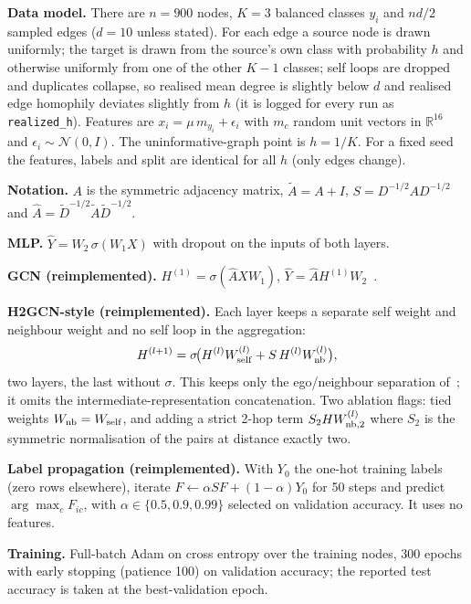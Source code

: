 \textbf{Data model.} There are $n=900$ nodes, $K=3$ balanced classes $y_i$ and $n d/2$ sampled edges ($d=10$ unless stated). For each edge a source node is drawn uniformly; the target is drawn from the source's own class with probability $h$ and otherwise uniformly from one of the other $K-1$ classes; self loops are dropped and duplicates collapse, so realised mean degree is slightly below $d$ and realised edge homophily deviates slightly from $h$ (it is logged for every run as \texttt{realized\_h}). Features are $x_i=\mu\, m_{y_i}+\epsilon_i$ with $m_c$ random unit vectors in $\mathbb{R}^{16}$ and $\epsilon_i\sim\mathcal{N}(0,I)$. The uninformative-graph point is $h=1/K$. For a fixed seed the features, labels and split are identical for all $h$ (only edges change).

\textbf{Notation.} $A$ is the symmetric adjacency matrix, $\tilde A=A+I$, $S=D^{-1/2}AD^{-1/2}$ and $\hat A=\tilde D^{-1/2}\tilde A\tilde D^{-1/2}$.

\textbf{MLP.} $\hat Y = W_2\,\sigma(W_1 X)$ with dropout on the inputs of both layers.

\textbf{GCN (reimplemented).} $H^{(1)}=\sigma(\hat A X W_1)$, $\hat Y=\hat A H^{(1)}W_2$~\cite{kipf2016semi}.

\textbf{H2GCN-style (reimplemented).} Each layer keeps a separate self weight and neighbour weight and no self loop in the aggregation:
\begin{equation}
H^{(l+1)}=\sigma\!\big(H^{(l)}W_{\rm self}^{(l)}+ S\,H^{(l)}W_{\rm nb}^{(l)}\big),
\end{equation}
two layers, the last without $\sigma$. This keeps only the ego/neighbour separation of~\cite{zhu2020beyond}; it omits the intermediate-representation concatenation. Two ablation flags: tied weights $W_{\rm nb}=W_{\rm self}$, and adding a strict 2-hop term $S_2 H W^{(l)}_{{\rm nb},2}$ where $S_2$ is the symmetric normalisation of the pairs at distance exactly two.

\textbf{Label propagation (reimplemented).} With $Y_0$ the one-hot training labels (zero rows elsewhere), iterate $F\leftarrow \alpha S F+(1-\alpha)Y_0$ for 50 steps and predict $\arg\max_c F_{ic}$, with $\alpha\in\{0.5,0.9,0.99\}$ selected on validation accuracy. It uses no features.

\textbf{Training.} Full-batch Adam on cross entropy over the training nodes, 300 epochs with early stopping (patience 100) on validation accuracy; the reported test accuracy is taken at the best-validation epoch.
